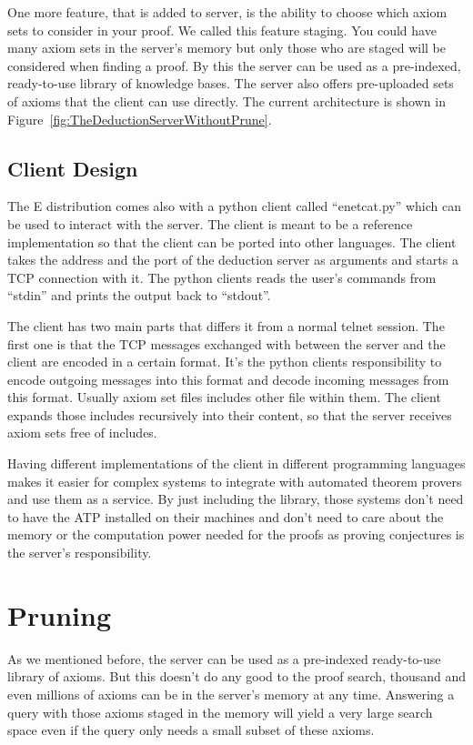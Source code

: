 
One more feature, that is added to server, is the ability to choose which axiom sets to consider in your proof. We called this feature staging. You could have many axiom sets in the server's memory but only those who are staged will be considered when finding a proof. By this the server can be used as a pre-indexed, ready-to-use library of knowledge bases. The server also offers pre-uploaded sets of axioms that the client can use directly. The current architecture is shown in Figure~\ref{fig:TheDeductionServerWithoutPrune}.


\subsection{Client Design}
The E distribution comes also with a python client called ``enetcat.py'' which can be used to interact with the server. The client is meant to be a reference implementation so that the client can be ported into other languages. The client takes the address and the port of the deduction server as arguments and starts a TCP connection with it. The python clients reads the user's commands from ``stdin'' and prints the output back to ``stdout''.

The client has two main parts that differs it from a normal telnet session. The first one is that the TCP messages exchanged with between the server and the client are encoded in a certain format. It's the python clients responsibility to encode outgoing messages into this format and decode incoming messages from this format. Usually axiom set files includes other file within them. The client expands those includes recursively into their content, so that the server receives axiom sets free of includes.

Having different implementations of the client in different programming languages makes it easier for complex systems to integrate with automated theorem provers and use them as a service. By just including the library, those systems don't need to have the ATP installed on their machines and don't need to care about the memory or the computation power needed for the proofs as proving conjectures is the server's responsibility.

\section{Pruning}
As we mentioned before, the server can be used as a pre-indexed ready-to-use library of axioms. But this doesn't do any good to the proof search, thousand and even millions of axioms can be in the server's memory at any time. Answering a query with those axioms staged in the memory will yield a very large search space even if the query only needs a small subset of these axioms.

